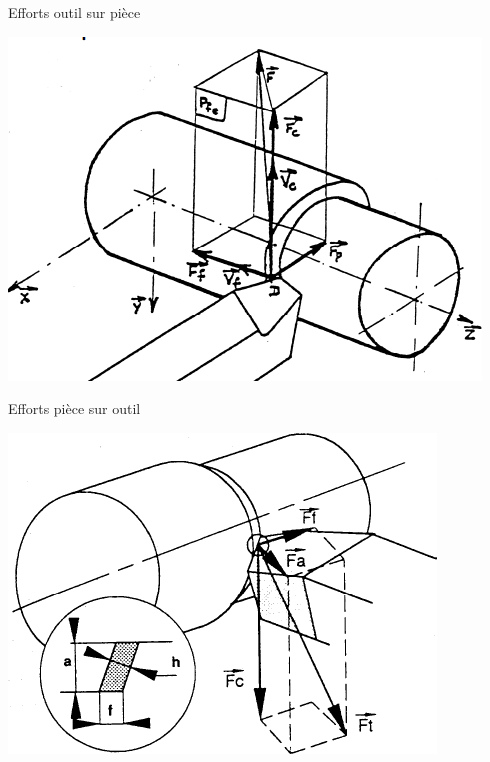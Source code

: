 \documentclass[11pt,oneside]{article}
\begin{document}
\noindent \begin{minipage}[c]{.45\linewidth}
\begin{center}
Efforts outil sur pièce

\includegraphics[width=\textwidth]{png/fig_24}
\end{center}
\end{minipage}\hfill
\begin{minipage}[c]{.45\linewidth}
\begin{center}
Efforts pièce sur outil

\includegraphics[width=\textwidth]{png/fig_25}
\end{center}

\end{minipage}
\end{document}
